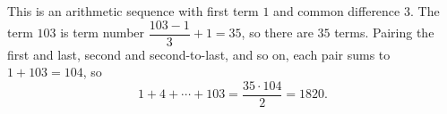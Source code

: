 This is an arithmetic sequence with first term $1$ and common difference $3$. The term $103$ is term number $\dfrac{103-1}{3}+1=35$, so there are $35$ terms. Pairing the first and last, second and second-to-last, and so on, each pair sums to $1+103=104$, so
\[1+4+\cdots+103=\dfrac{35\cdot104}{2}=\boxed{1820}.\]
